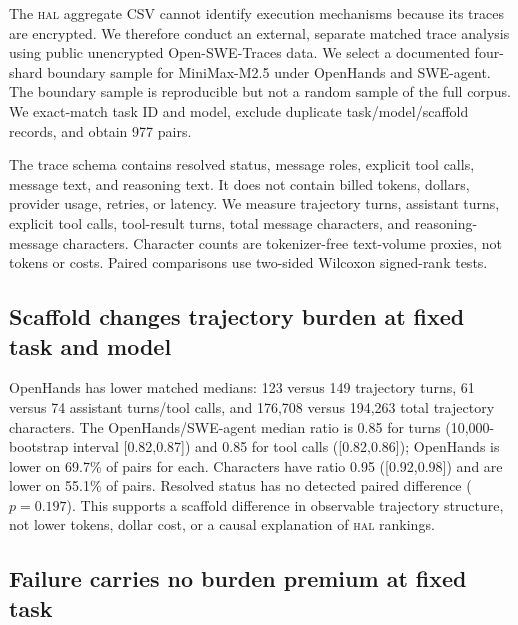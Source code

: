 \documentclass[11pt]{article}
\newcommand{\hal}{\textsc{hal}}
\begin{document}
The \hal{} aggregate CSV cannot identify execution mechanisms because its traces are encrypted. We therefore conduct an external, separate matched trace analysis using public unencrypted Open-SWE-Traces data. We select a documented four-shard boundary sample for MiniMax-M2.5 under OpenHands and SWE-agent. The boundary sample is reproducible but not a random sample of the full corpus. We exact-match task ID and model, exclude duplicate task/model/scaffold records, and obtain 977 pairs.

The trace schema contains resolved status, message roles, explicit tool calls, message text, and reasoning text. It does not contain billed tokens, dollars, provider usage, retries, or latency. We measure trajectory turns, assistant turns, explicit tool calls, tool-result turns, total message characters, and reasoning-message characters. Character counts are tokenizer-free text-volume proxies, not tokens or costs. Paired comparisons use two-sided Wilcoxon signed-rank tests.

\subsection{Scaffold changes trajectory burden at fixed task and model}

OpenHands has lower matched medians: 123 versus 149 trajectory turns, 61 versus 74 assistant turns/tool calls, and 176,708 versus 194,263 total trajectory characters. The OpenHands/SWE-agent median ratio is 0.85 for turns (10,000-bootstrap interval [0.82,0.87]) and 0.85 for tool calls ([0.82,0.86]); OpenHands is lower on 69.7\% of pairs for each. Characters have ratio 0.95 ([0.92,0.98]) and are lower on 55.1\% of pairs. Resolved status has no detected paired difference (\(p=0.197\)). This supports a scaffold difference in observable trajectory structure, not lower tokens, dollar cost, or a causal explanation of \hal{} rankings.

\subsection{Failure carries no burden premium at fixed task}
\label{sec:failure-burden}
\end{document}
